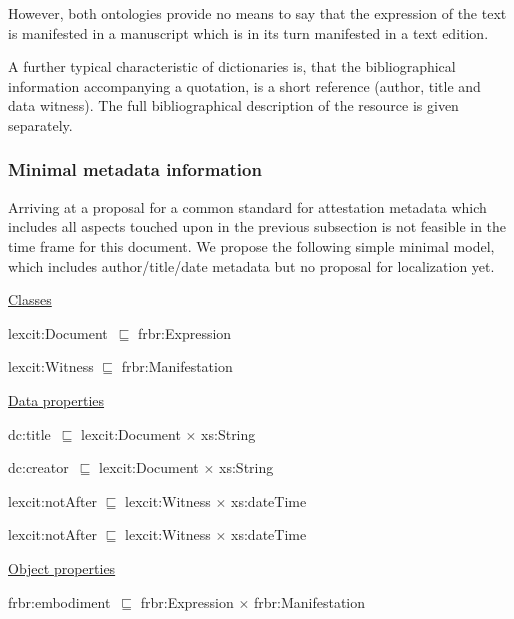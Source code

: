 \documentclass[10pt]{article}
\begin{document}
 However, both ontologies provide no means to say that the expression of the text is manifested in a manuscript which is in its turn manifested in a text edition.\par

 A further typical characteristic of dictionaries is, that the bibliographical information accompanying a quotation, is a short reference (author, title and data witness). The full bibliographical description of the resource is given separately.\par


\subsubsection*{Minimal metadata information}


Arriving at a proposal for a common standard for attestation metadata which includes all aspects touched upon in the previous subsection is not feasible in the time frame for this document. We propose the following simple minimal model, which includes author/title/date metadata but no proposal for localization yet.


\bigskip


{\fontsize{9pt}{10.8pt}\selectfont 
\uline{Classes}

lexcit:Document\  $\sqsubseteq$  frbr:Expression

lexcit:Witness $\sqsubseteq$  frbr:Manifestation




 \uline{Data properties}

dc:title\  $\sqsubseteq$  lexcit:Document $ \times $  xs:String

dc:creator\  $\sqsubseteq$  lexcit:Document $ \times $  xs:String

lexcit:notAfter $\sqsubseteq$  lexcit:Witness $ \times $  xs:dateTime

lexcit:notAfter $\sqsubseteq$  lexcit:Witness $ \times $  xs:dateTime





\uline{Object properties}

frbr:embodiment\   $\sqsubseteq$  frbr:Expression $ \times $  frbr:Manifestation
}


\par





\end{document}
